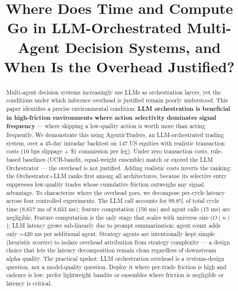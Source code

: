 \documentclass[10pt,conference]{IEEEtran}
\begin{document}
\title{Where Does Time and Compute Go in LLM-Orchestrated Multi-Agent Decision Systems, and When Is the Overhead Justified?}

\author{
}

\maketitle

\begin{abstract}
Multi-agent decision systems increasingly use LLMs as orchestration layers, yet the conditions under which inference overhead is justified remain poorly understood. This paper identifies a precise environmental condition: \textbf{LLM orchestration is beneficial in high-friction environments where action selectivity dominates signal frequency} --- where skipping a low-quality action is worth more than acting frequently. We demonstrate this using AgenticTraders, an LLM-orchestrated trading system, over a 45-day intraday backtest on 147 US equities with realistic transaction costs (10 bps slippage + \$1 commission per leg). Under zero transaction costs, rule-based baselines (UCB-bandit, equal-weight ensemble) match or exceed the LLM Orchestrator --- the overhead is not justified. Adding realistic costs inverts the ranking: the Orchestrator+LLM ranks first among all architectures, because its selective entry suppresses low-quality trades whose cumulative friction outweighs any signal advantage. To characterize where the overhead goes, we decompose per-cycle latency across four controlled experiments. The LLM call accounts for 99.8\% of total cycle time (8,617 ms of 8,633 ms); feature computation (156 ms) and agent calls (15 ms) are negligible. Feature computation is the only stage that scales with universe size ($O(n)$); LLM latency grows sub-linearly due to prompt summarization; agent count adds only $\sim$420 ms per additional agent. Strategy agents are intentionally kept simple (heuristic scorers) to isolate overhead attribution from strategy complexity --- a design choice that lets the latency decomposition remain clean regardless of downstream alpha quality. The practical upshot: LLM orchestration overhead is a systems-design question, not a model-quality question. Deploy it where per-trade friction is high and cadence is low; prefer lightweight bandits or ensembles where friction is negligible or latency is critical.
\end{abstract}
\end{document}

